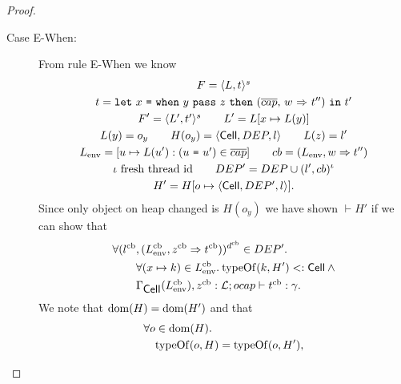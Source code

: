 \begin{proof}
\begin{description}
\begin{description}
\begin{description}
            \item[Case {\sc E-When}:] From rule {\sc E-When} we know
              \begin{equation}
                \begin{gathered}
                  F = \mbox{$\langle L, t \rangle^s$} \\ 
                  t = \mbox{\mdseries\texttt{let}~$x$~\texttt{=}~$\mbox{\mdseries\texttt{when}~$y$~\texttt{pass}~$z$~\texttt{then}~$\mbox{\mdseries($\overline{cap}$, $w$~$\Rightarrow$~$t''$)}$}$~\texttt{in}~$t'$} \\
                  F' = \mbox{$\langle L', t' \rangle^s$} \quad\quad L' = L[x \mapsto L(y)] \\
                  L(y) = o_y \quad\quad H(o_y) = \mbox{$\langle \mbox{$\mathsf{Cell}$}{}, DEP, l \rangle$} \quad\quad L(z) = l' \\
                  L_{\text{env}} = [u \mapsto L(u'): (\mbox{\mdseries$u$~\texttt{=}~$u'$}) \in
                  \overline{cap}] \quad\quad cb = (L_{\text{env}}, w \Rightarrow
                  t'') \\
                  \iota \text{ fresh thread id} \quad\quad DEP' = DEP \cup (l',
                  cb)^\iota
                  \\
                  H' = H[o \mapsto \mbox{$\langle \mbox{$\mathsf{Cell}$}{}, DEP', l \rangle$}].
                \end{gathered}
              \end{equation}
              Since only object on heap changed is $H(o_y)$ we have shown
              $\vdash H'$ if we can show that
              \begin{equation}
                \begin{aligned}
                  \forall (l^{\text{cb}}&, (L^{\text{cb}}_{\text{env}}, z^{\text{cb}} \Rightarrow t^{\text{cb}}))^{d^{\text{cb}}} \in
                  DEP'. \\
                  &\forall (x \mapsto k) \in L^{\text{cb}}_{\text{env}}.\: \mbox{$\mathrm{typeOf}$}{(k, H')} <:
                  \mbox{$\mathsf{Cell}$} \: \land \\
                  &\mbox{$\Gamma_{\mbox{$\mathsf{Cell}$}{}}(L^{\text{cb}}_{\text{env}}), z^{\text{cb}}:
                  \mbox{$\mathcal{L}$};\mbox{$ocap$}\vdash t^{\text{cb}}:\gamma$} .
                \end{aligned}
              \end{equation}
              We note that $\mbox{$\mathrm{dom}$}(H) = \mbox{$\mathrm{dom}$}(H')$ and that
              \begin{equation}
                \begin{aligned}
                  \forall o &\in \dom(H).  \\
                    &\typeOf(o, H) = \typeOf(o, H'),
                \end{aligned}

\end{equation}
\end{description}
\end{description}
\end{description}
\end{proof}
